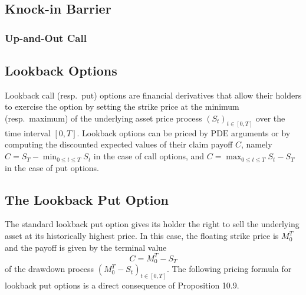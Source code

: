 \clearpage
\subsection{Knock-in Barrier}

\subsubsection{Up-and-Out Call}

\subsection{Lookback Options}
Lookback call (resp.\ $\mathrm{put}$) options are financial derivatives that allow their holders to exercise the option by setting the strike price at the minimum (resp.\ maximum) of the underlying asset price process $(S_t)_{t \in [0,T]}$ over the time interval $[0,T]$. Lookback options can be priced by $\mathrm{PDE}$ arguments or by computing the discounted expected values of their claim payoff $C$, namely $C = S_T - \min_{0 \le t \le T} S_t$ in the case of call options, and $C = \max_{0 \le t \le T} S_t - S_T$ in the case of put options.

\subsection{The Lookback Put Option}
The standard lookback put option gives its holder the right to sell the underlying asset at its historically highest price. In this case, the floating strike price is $M_0^T$ and the payoff is given by the terminal value
\begin{equation}
	C = M_0^T - S_T
\end{equation}
of the drawdown process $(M_0^T - S_t)_{t\in[0,T]}$. The following pricing formula for lookback put options is a direct consequence of Proposition 10.9.

